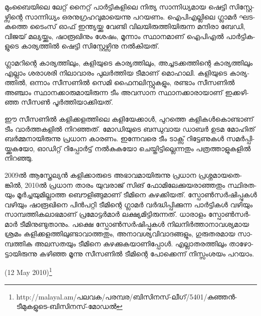 ­മും­ബൈ­യി­ലെ ലേ­റ്റ് നൈ­റ്റ് പാര്‍­ട്ടി­ക­ളി­ലെ നി­ത്യ സാ­ന്നി­ധ്യ­മായ ഷെ­ട്ടി സി­സ്റ്റേ­ഴ്സി­ന്റെ സാ­ന്നി­ധ്യം ഒര­നു­ഗ്ര­ഹ­വു­മാ­യെ­ന്നു 
പറ­യ­ണം. ഐപി­എ­ല്ലി­ലെ ഗ്ലാ­മര്‍ ഘട­ക­ത്തെ ടൈം­സ് ഓഫ് ഇന്ത്യ­യ്ക്കു വേ­ണ്ടി വി­ല­യി­രു­ത്തി­യി­രു­ന്ന മന്ദി­രാ ബേ­ഡി, 
വി­ജ­യ് മല്യ­യ്ക്കും, ഷാ­രൂ­ഖി­നും ശേ­ഷം, മൂ­ന്നാം സ്ഥാ­ന­മാ­ണ് ഐപി­എല്‍ പാര്‍­ട്ടി­ക­ളു­ടെ കാ­ര്യ­ത്തില്‍ ഷെ­ട്ടി സി­സ്റ്റേ­ഴ്സി­നു 
നല്‍­കി­യ­ത്.

­ഗ്ലാ­മ­റി­ന്റെ കാ­ര്യ­ത്തി­ലും, കളി­യു­ടെ കാ­ര്യ­ത്തി­ലും, അച്ച­ട­ക്ക­ത്തി­ന്റെ കാ­ര്യ­ത്തി­ലും എല്ലാം ശരാ­ശ­രി നി­ലാ­വാ­രം പു­ലര്‍­ത്തിയ 
ടീ­മാ­ണ് മൊ­ഹാ­ലി. കളി­യു­ടെ കാ­ര്യ­ത്തില്‍, ഒന്നാം സീ­സ­ണില്‍ സെ­മി ഫൈ­ന­ലി­സ്റ്റു­ക­ളും, രണ്ടാം സീ­സ­ണില്‍ അഞ്ചാം 
സ്ഥാ­ന­ക്കാ­രു­മാ­യി­രു­ന്ന ടീം അവ­സാന സ്ഥാ­ന­ക്കാ­രാ­യാ­ണ് ഇക്ക­ഴി­ഞ്ഞ സീ­സണ്‍ പൂര്‍­ത്തി­യാ­ക്കി­യ­ത്.

ഈ സീ­സ­ണില്‍ കളി­ക്ക­ള­ത്തി­ലെ കളി­യേ­ക്കാള്‍, പു­റ­ത്തെ കളി­കള്‍­കൊ­ണ്ടാ­ണ് ടീം വാര്‍­ത്ത­ക­ളില്‍ നി­റ­ഞ്ഞ­ത്. 
മോ­ഡി­യു­ടെ ബന്ധു­വായ ഡാ­ബര്‍ ഉടമ മോ­ഹി­ത് ബര്‍­മ്മ­നാ­യി­രു­ന്നു പ്ര­ധാന കാ­ര­ണം. ഇന്നേ­വ­രെ ടീം ടാ­ക്സ് റി­ട്ടേ­ണു­കള്‍ 
സമര്‍­പ്പി­യ്ക്കു­ക­യോ, ഓഡി­റ്റ് റി­പ്പോര്‍­ട്ട് നല്‍­കു­ക­യോ ചെ­യ്തി­ട്ടി­ല്ലെ­ന്ന­തും പത്ര­ത്താ­ളു­ക­ളില്‍ നി­റ­ഞ്ഞു­.

2009ല്‍ ആസ്ത്രേ­ല്യന്‍ കളി­ക്കാ­രു­ടെ അഭാ­വ­മാ­യി­രു­ന്നു പ്ര­ധാന പ്ര­ശ്ന­മാ­യ­തെ­ങ്കില്‍, 2010ല്‍ പ്ര­ധാന താ­രം യു­വ­രാ­ജ് സി­ങ് 
ഫോ­മി­ലേ­ക്കു­യ­രാ­ഞ്ഞ­തും സ്ഥി­ര­ത­യും മൂര്‍­ച്ച­യു­മി­ല്ലാ­ത്ത ബൌ­ളി­ങ്ങു­മാ­ണ് ടീ­മി­നെ കു­ഴ­ക്കി­യ­ത്. സ്പോണ്‍­സര്‍­ഷി­പ്പു­കള്‍ വഴി­യും 
ഷാ­രൂ­ഖി­നെ പിന്‍­പ­റ്റി ടീ­മി­ന്റെ ഗ്ലാ­മര്‍ വര്‍­ദ്ധി­പ്പി­ക്കു­ന്ന പാര്‍­ട്ടി­കള്‍ വഴി­യും സാ­മ്പ­ത്തി­ക­ലാ­ഭ­മാ­ണ് പ്ര­മോ­ട്ടര്‍­മാര്‍ ലക്ഷ്യ­മി­ട്ടി­രു­ന്ന­ത്. 
ധാ­രാ­ളം സ്പോണ്‍­സര്‍­മാര്‍ ടീ­മി­നു­ണ്ടു­താ­നും. പക്ഷെ സ്പോണ്‍­സര്‍­ഷി­പ്പു­കള്‍ നി­ല­നിര്‍­ത്താ­നാ­വ­ശ്യ­മായ ശ്ര­മം 
കളി­ക്ക­ള­ത്തി­ലു­ണ്ടാ­വാ­ത്ത­തും, അനാ­വ­ശ്യ­വി­വാ­ദ­ങ്ങ­ളും, ഗു­രു­ത­ര­മായ സാ­മ്പ­ത്തിക അല­സ­ത­യും ടീ­മി­നെ കു­ഴ­ക്കു­ക­യാ­ണി­പ്പോള്‍. 
എല്ലാ­ത­ര­ത്തി­ലും താ­ഴോ­ട്ടാ­യി­രു­ന്നു കഴി­ഞ്ഞ മൂ­ന്നു സീ­സ­ണില്‍ ടീ­മി­ന്റെ പോ­ക്കെ­ന്ന് നി­സ്സം­ശ­യം പറ­യാം­.

(12 May 2010)\footnote{http://malayal.am/പലവക/പരമ്പര/ബിസിനസ്-ലീഗ്/5401/കുഞ്ഞന്‍-ടീമുകളുടെ-ബിസിനസ്-മോഡല്‍}

\newpage
